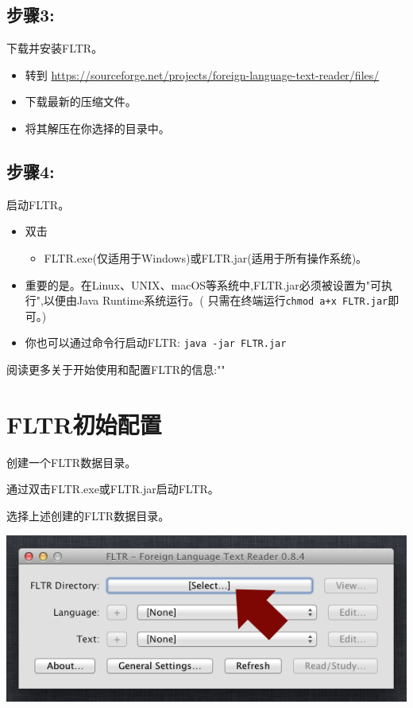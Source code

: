\documentclass[cn,10pt,math=newtx,citestyle=gb7714-2015,bibstyle=gb7714-2015]{elegantbook}
\begin{document}
\section*{步骤3:}
 下载并安装FLTR。
\begin{itemize}
    \item   转到 \url{https://sourceforge.net/projects/foreign-language-text-reader/files/} 
    \item 下载最新的压缩文件。
    \item 将其解压在你选择的目录中。
\end{itemize}

\section*{步骤4:}
启动FLTR。
\begin{itemize}

\item 双击
 \begin{itemize}\item FLTR.exe(仅适用于Windows)或FLTR.jar(适用于所有操作系统)。
 \end{itemize}

    \item 重要的是。在Linux、UNIX、macOS等系统中,FLTR.jar必须被设置为"可执行",以便由Java Runtime系统运行。( 只需在终端运行\lstinline{chmod a+x FLTR.jar}即可。)
    \item 你也可以通过命令行启动FLTR: \lstinline{java -jar FLTR.jar}
       
\end{itemize} 

阅读更多关于开始使用和配置FLTR的信息:""


\chapter{FLTR初始配置}
\label{FLTR初始配置}
创建一个FLTR数据目录。

通过双击FLTR.exe或FLTR.jar启动FLTR。

选择上述创建的FLTR数据目录。

\includegraphics[scale=0.6]{image/images-017.png}
\end{document}
